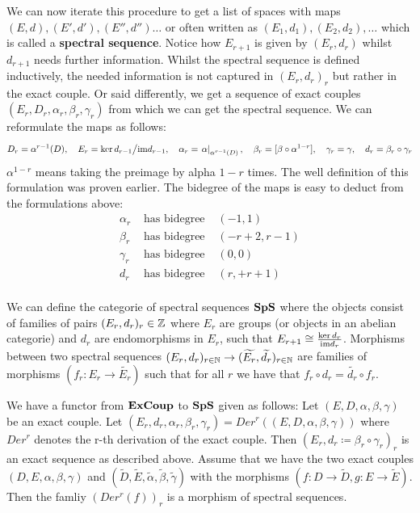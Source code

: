 \begin{definition}
	We can now iterate this procedure to get a list of spaces with maps
	$ (E,d),(E',d'),(E'',d'')\dots$ or often written as $(E_1,d_1),(E_2,d_2),\dots$ which is called a \textbf{spectral sequence}. Notice how $E_{r+1}$ is given by $(E_r,d_r)$ whilst $d_{r+1}$ needs further information. Whilst the spectral sequence is defined inductively, the needed information is not captured in $(E_r,d_r)_r$ but rather in the exact couple. Or said differently, we get a sequence of exact couples $(E_r,D_r,\alpha_r,\beta_r,\gamma_r)$ from which we can get the spectral sequence. We can reformulate the maps as follows:
	\begin{equation*}
		D_r= \alpha^{r-1}(D),\quad E_r=\ker d_{r-1}\big/ \mathrm{im} d_{r-1},\quad  \alpha_r= \left.\alpha\right|_{ \alpha^{r-1}(D)} ,\quad \beta_r =[\beta \circ  \alpha^{1-r}], \quad \gamma_r= \gamma, \quad  d_r= \beta_r\circ \gamma_r
	\end{equation*} $\alpha^{1-r}$ means taking the preimage by alpha $1-r$ times. The well definition of this formulation was proven earlier. 
	The bidegree of the maps is easy to deduct from the formulations above:
	\begin{equation*}
		\begin{array}{lll}
			\alpha_r&\text{ has bidegree }& (-1,1)    \\
			\beta_r &\text{ has bidegree }& (-r+2,r-1)\\
			\gamma_r&\text{ has bidegree }& (0,0)     \\
			d_r     &\text{ has bidegree }& (r,+r+1)\\
		\end{array}
	\end{equation*}
\end{definition}
\begin{corollary}
	We can define the categorie of spectral sequences $\operatorname{\mathbf{SpS}}$ where the objects consist of families of pairs $(E_r,d_r)_r\in \mathbb{Z}$ where $E_r$ are groups (or objects in an abelian categorie) and $d_r$ are endomorphisms in $E_r$, such that $E_{r+1}\cong \frac{\ker{d_r}}{\mathrm{im} d_r}$. Morphisms between two spectral sequences $(E_r,d_r)_{r\in \mathbb{N}}\to (\widetilde{E_r},\widetilde{d_r})_{r\in \mathbb{N}}$ are families of morphisms $(f_r:E_r\to \widetilde{E_r})$ such that for all $r$ we have that $f_r\circ d_r=\widetilde{d_r}\circ f_r$.
\end{corollary}
\begin{corollary}
	We have a functor from $\operatorname{\mathbf{ExCoup}}$ to $\operatorname{\mathbf{SpS}}$ given as follows: Let $(E,D,\alpha,\beta,\gamma)$ be an exact couple. Let $(E_r,d_r,\alpha_r,\beta_r,\gamma_r)=Der^r((E,D,\alpha,\beta,\gamma))$ where $Der^r$ denotes the r-th derivation of the exact couple. Then $(E_r,d_r\coloneq \beta_r\circ \gamma_r)_r$ is an exact sequence as described above. Assume that we have the two exact couples $(D,E,\alpha,\beta,\gamma)$ and $(\widetilde{D},\widetilde{E},\widetilde{\alpha},\widetilde{\beta},\widetilde{\gamma})$ with the morphisms $(f:D\to \widetilde{D},g:E\to \widetilde{E})$. Then the famliy $(Der^r(f))_r$ is a morphism of spectral sequences.
\end{corollary}
